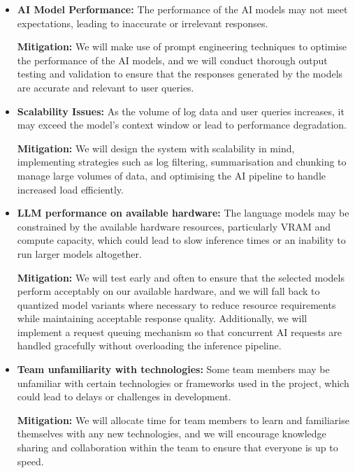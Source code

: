 \documentclass[12pt, a4paper]{article}
\begin{document}
\begin{itemize}
    \item \textbf{AI Model Performance:} The performance of the AI models may not meet expectations, leading to inaccurate or irrelevant responses.

          \textbf{Mitigation:} We will make use of prompt engineering techniques to optimise the performance of the AI models, and we will conduct thorough output testing and validation to ensure that the responses generated by the models are accurate and relevant to user queries.

    \item \textbf{Scalability Issues:} As the volume of log data and user queries increases, it may exceed the model's context window or lead to performance degradation.

          \textbf{Mitigation:} We will design the system with scalability in mind, implementing strategies such as log filtering, summarisation and chunking to manage large volumes of data, and optimising the AI pipeline to handle increased load efficiently.

    \item \textbf{LLM performance on available hardware:} The language models may be constrained by the available hardware resources, particularly VRAM and compute capacity, which could lead to slow inference times or an inability to run larger models altogether.

          \textbf{Mitigation:} We will test early and often to ensure that the selected models perform acceptably on our available hardware, and we will fall back to quantized model variants where necessary to reduce resource requirements while maintaining acceptable response quality. Additionally, we will implement a request queuing mechanism so that concurrent AI requests are handled gracefully without overloading the inference pipeline.

    \item \textbf{Team unfamiliarity with technologies:} Some team members may be unfamiliar with certain technologies or frameworks used in the project, which could lead to delays or challenges in development.

          \textbf{Mitigation:} We will allocate time for team members to learn and familiarise themselves with any new technologies, and we will encourage knowledge sharing and collaboration within the team to ensure that everyone is up to speed.
\end{itemize}
\end{document}

